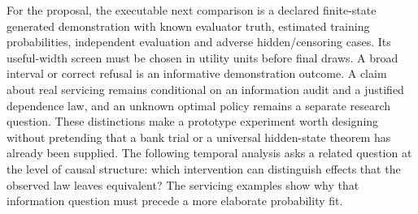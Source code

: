 For the proposal, the executable next comparison is a declared
finite-state generated demonstration with known evaluator truth,
estimated training probabilities, independent evaluation and adverse
hidden/censoring cases. Its useful-width screen must be chosen in
utility units before final draws. A broad interval or correct refusal is
an informative demonstration outcome. A claim about real servicing
remains conditional on an information audit and a justified dependence
law, and an unknown optimal policy remains a separate research question.
These distinctions make a prototype experiment worth designing without
pretending that a bank trial or a universal hidden-state theorem has
already been supplied. The following temporal analysis asks a related question at the level of causal structure: which intervention can distinguish effects that the observed law leaves equivalent? The servicing examples show why that information question must precede a more elaborate probability fit.

\label{exec13:servicing-observed-end}

